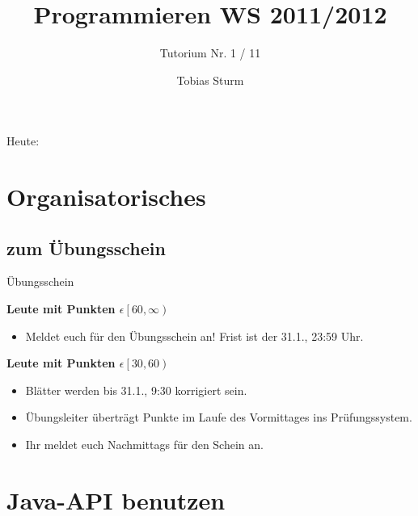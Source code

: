 \documentclass[18pt]{beamer}
\title[Proggen WS11/12]{Programmieren WS 2011/2012}
\subtitle{Tutorium Nr. 1 / 11}
\author{Tobias Sturm} %
\institute{Zertifizierbare Vertrauenswürdige Informatiksysteme}
\date[23.1.12] %
\begin{document}


\begin{frame}
	\titlepage
\end{frame}


\begin{frame}{Heute:}
	\tableofcontents
\end{frame}


\section{Organisatorisches}
\subsection*{zum Übungsschein}
\begin{frame}{Übungsschein}
	
	\textbf{Leute mit Punkten $\epsilon \left[60, \infty \right)$}
		\begin{itemize}
			\item Meldet euch für den Übungsschein an! Frist ist der 31.1., 23:59 Uhr.
		\end{itemize}

	\textbf{Leute mit Punkten $\epsilon \left[30, 60 \right)$}
	\begin{itemize}
		\item Blätter werden bis 31.1., 9:30 korrigiert sein.
		\item Übungsleiter überträgt Punkte im Laufe des Vormittages ins Prüfungssystem.
		\item Ihr meldet euch Nachmittags für den Schein an.
	\end{itemize}

\end{frame}

\section{Java-API benutzen}
\end{document}
